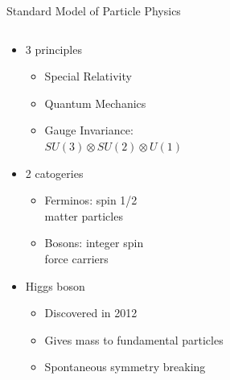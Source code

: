 \documentclass[10pt]{beamer}
\begin{document}
\begin{frame}{Standard Model of Particle Physics}
    \begin{columns}
        \begin{column}{0.4\textwidth}
            \begin{itemize}
                \item 3 principles
                \begin{itemize}
                    \item Special Relativity
                    \item Quantum Mechanics
                    \item Gauge Invariance:\\$SU(3) \otimes SU(2) \otimes U(1)$
                \end{itemize}
                \item 2 catogeries
                \begin{itemize}
                    \item Ferminos: spin 1/2\\matter particles
                    \item Bosons: integer spin\\force carriers
                \end{itemize}
                \item Higgs boson
                \begin{itemize}
                    \item Discovered in 2012
                    \item Gives mass to fundamental particles
                    \item Spontaneous symmetry breaking
                \end{itemize}
            \end{itemize}
        \end{column}
        \begin{column}{0.6\textwidth}
            \begin{figure}

\end{figure}
\end{column}
\end{columns}
\end{frame}
\end{document}
